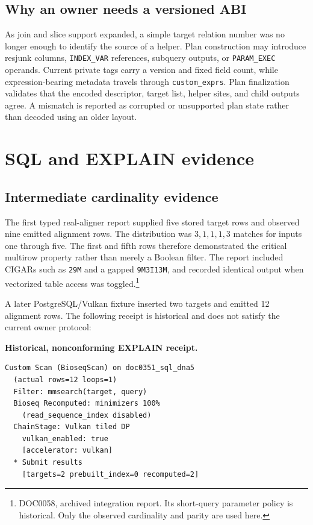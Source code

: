 \subsection{Why an owner needs a versioned ABI}

As join and slice support expanded, a simple target relation number was no
longer enough to identify the source of a helper.  Plan construction may
introduce resjunk columns, \texttt{INDEX\_VAR} references, subquery outputs,
or \texttt{PARAM\_EXEC} operands.  Current private tags carry a version and
fixed field count, while expression-bearing metadata travels through
\texttt{custom\_exprs}.  Plan finalization validates that the encoded
descriptor, target list, helper sites, and child outputs agree.  A mismatch is
reported as corrupted or unsupported plan state rather than decoded using an
older layout.

\section{SQL and EXPLAIN evidence}
\label{sec:customscan-explain-evidence}

\subsection{Intermediate cardinality evidence}

The first typed real-aligner report supplied five stored target rows and
observed nine emitted alignment rows.  The distribution was \(3,1,1,1,3\)
matches for inputs one through five.  The first and fifth rows therefore
demonstrated the critical multirow property rather than merely a Boolean
filter.  The report included CIGARs such as \texttt{29M} and a gapped
\texttt{9M3I13M}, and recorded identical output when vectorized table access
was toggled.\footnote{DOC0058, archived integration report.  Its short-query
parameter policy is historical.  Only the observed cardinality and parity are
used here.}

A later PostgreSQL/Vulkan fixture inserted two targets and emitted 12
alignment rows.  The following receipt is historical and does not satisfy the
current owner protocol:

\noindent\textbf{Historical, nonconforming EXPLAIN receipt.}

\begin{lstlisting}
Custom Scan (BioseqScan) on doc0351_sql_dna5
  (actual rows=12 loops=1)
  Filter: mmsearch(target, query)
  Bioseq Recomputed: minimizers 100%
    (read_sequence_index disabled)
  ChainStage: Vulkan tiled DP
    vulkan_enabled: true
    [accelerator: vulkan]
  * Submit results
    [targets=2 prebuilt_index=0 recomputed=2]
\end{lstlisting}

